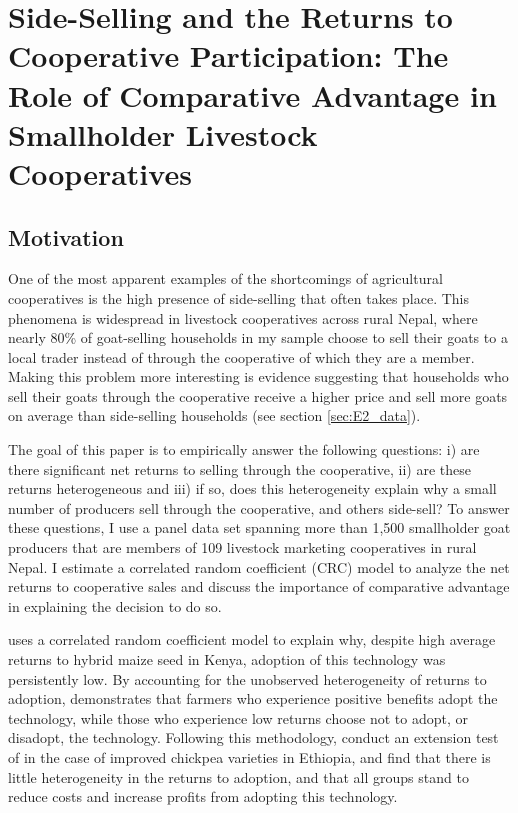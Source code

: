 \documentclass[11pt]{article}
\begin{document}
\newpage
\singlespacing
\section{Side-Selling and the Returns to Cooperative Participation: The Role of Comparative Advantage in Smallholder Livestock Cooperatives} \label{sec:E2}
\doublespacing

\subsection{Motivation} \label{sec:E2_motivation}
One of the most apparent examples of the shortcomings of agricultural cooperatives is the high presence of side-selling that often takes place. This phenomena is widespread in livestock cooperatives across rural Nepal, where nearly 80\% of goat-selling households in my sample choose to sell their goats to a local trader instead of through the cooperative of which they are a member. Making this problem more interesting is evidence suggesting that households who sell their goats through the cooperative receive a higher price and sell more goats on average than side-selling households (see section \ref{sec:E2_data}).

The goal of this paper is to empirically answer the following questions: i) are there significant net returns to selling through the cooperative, ii) are these returns heterogeneous and iii) if so, does this heterogeneity explain why a small number of producers sell through the cooperative, and others side-sell? To answer these questions, I use a panel data set spanning more than 1,500 smallholder goat producers that are members of 109 livestock marketing cooperatives in rural Nepal. I estimate a correlated random coefficient (CRC) model to analyze the net returns to cooperative sales and discuss the importance of comparative advantage in explaining the decision to do so. 

\citet{suri11} uses a correlated random coefficient model to explain why, despite high average returns to hybrid maize seed in Kenya, adoption of this technology was persistently low. By accounting for the unobserved heterogeneity of returns to adoption, \citet{suri11} demonstrates that farmers who experience positive benefits adopt the technology, while those who experience low returns choose not to adopt, or disadopt, the technology. Following this methodology, \citet{michler-et.al.18} conduct an extension test of \citet{suri11} in the case of improved chickpea varieties in Ethiopia, and find that there is little heterogeneity in the returns to adoption, and that all groups stand to reduce costs and increase profits from adopting this technology. 
\end{document}
